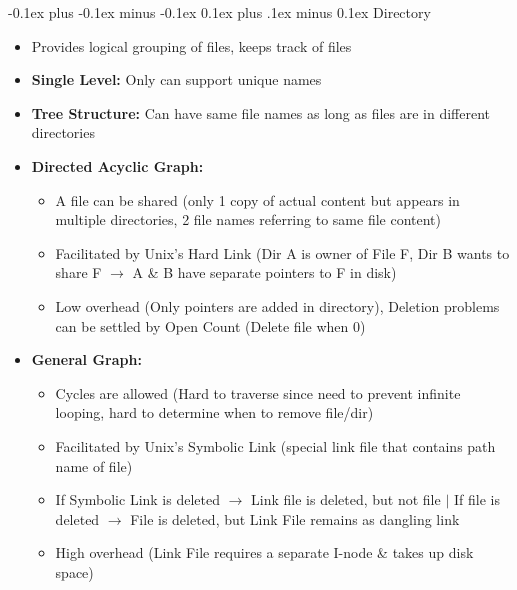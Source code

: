 \documentclass[landscape]{article}
\makeatletter
\renewcommand{\subsection}{\@startsection{subsection}{2}{0mm}%
  {-0.1ex plus -0.1ex minus -0.1ex}%
  {0.1ex plus .1ex minus 0.1ex}%
{\normalfont\scriptsize\bfseries}}
\makeatother
\begin{document}
\begin{multicols*}{6}
    \subsection{Directory}
    \begin{itemize}
      \item Provides logical grouping of files, keeps track of files
      \item \textbf{Single Level:} Only can support unique names
      \item \textbf{Tree Structure:} Can have same file names as long as files are in different directories
      \item \textbf{Directed Acyclic Graph:}
      \begin{itemize}
        \item A file can be shared (only 1 copy of actual content but appears in multiple directories, 2 file names referring to same file content)
        \item Facilitated by Unix's Hard Link (Dir A is owner of File F, Dir B wants to share F $\rightarrow$ A \& B have separate pointers to F in disk)
        \item Low overhead (Only pointers are added in directory), Deletion problems can be settled by Open Count (Delete file when 0)
      \end{itemize}
      \item \textbf{General Graph:}
      \begin{itemize}
        \item Cycles are allowed (Hard to traverse since need to prevent infinite looping, hard to determine when to remove file/dir)
        \item Facilitated by Unix's Symbolic Link (special link file that contains path name of file)
        \item If Symbolic Link is deleted $\rightarrow$ Link file is deleted, but not file $\vert$ If file is deleted $\rightarrow$ File is deleted, but Link File remains as dangling link
        \item High overhead (Link File requires a separate I-node \& takes up disk space)
      \end{itemize}
    \end{itemize}
  \end{multicols*}
\end{document}
